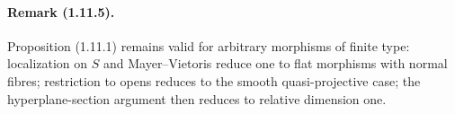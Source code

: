 \paragraph{Remark (1.11.5).}
Proposition (1.11.1) remains valid for arbitrary morphisms of finite type: localization on $S$ and Mayer--Vietoris reduce one to flat morphisms with normal fibres; restriction to opens reduces to the smooth quasi-projective case; the hyperplane-section argument then reduces to relative dimension one.

